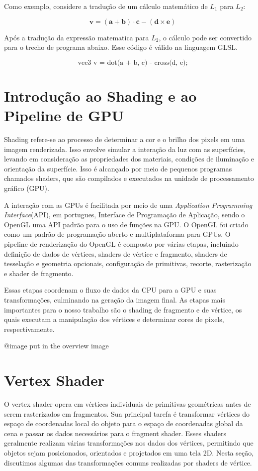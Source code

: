 \documentclass[english, 
               brazil, 
               bsc] %
               {dcomp-abntex2}
\begin{document}
Como exemplo, considere a tradução de um cálculo matemático de \( L_1 \) para \( L_2 \):

\[
 \quad \mathbf{v} = (\mathbf{a} + \mathbf{b}) \cdot \mathbf{c} - (\mathbf{d} \times \mathbf{e})
\]

Após a tradução da expressão matematica para \( L_2 \), o cálculo pode ser convertido para o trecho de programa abaixo. Esse código é válido na linguagem GLSL.

\[
\quad \text{{vec3 v = dot(a + b, c) - cross(d, e);}}
\]


\section{Introdução ao Shading e ao Pipeline de GPU}

Shading refere-se ao processo de determinar a cor e o brilho dos pixels em uma imagem renderizada. Isso envolve simular a interação da luz com as superfícies, levando em consideração as propriedades dos materiais, condições de iluminação e orientação da superfície. Isso é alcançado por meio de pequenos programas chamados shaders, que são compilados e executados na unidade de processamento gráfico (GPU).


A interação com as GPUs é facilitada por meio de uma 
\textit{ Application Programming Interface}(API), em portugues, Interface de Programação de Aplicação, sendo o OpenGL uma API padrão para o uso de funções na GPU. O OpenGL foi criado como um padrão de programação aberto e multiplataforma para GPUs. O pipeline de renderização do OpenGL é composto por várias etapas, incluindo definição de dados de vértices, shaders de vértice e fragmento, shaders de tesselação e geometria opcionais, configuração de primitivas, recorte, rasterização e shader de fragmento.

Essas etapas coordenam o fluxo de dados da CPU para a GPU e suas transformações, culminando na geração da imagem final. As etapas mais importantes para o nosso trabalho são o shading de fragmento e de vértice, os quais executam a manipulação dos vértices e determinar cores de pixels, respectivamente.

@image put in the overview image


\section{Vertex Shader}

O vertex shader opera em vértices individuais de primitivas geométricas antes de serem rasterizados em fragmentos. Sua principal tarefa é transformar vértices do espaço de coordenadas local do objeto para o espaço de coordenadas global da cena e passar os dados necessários para o fragment shader. Esses shaders geralmente realizam várias transformações nos dados dos vértices, permitindo que objetos sejam posicionados, orientados e projetados em uma tela 2D. Nesta seção, discutimos algumas das transformações comuns realizadas por shaders de vértice.
\end{document}
